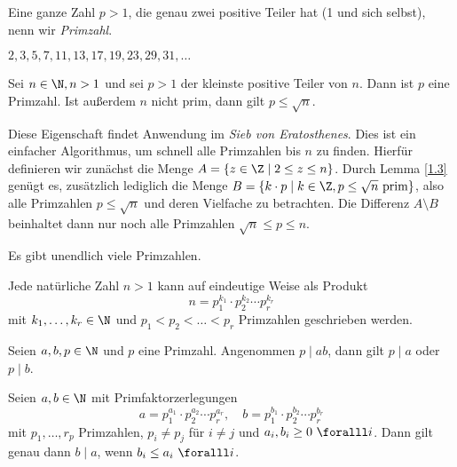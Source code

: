 \begin{defn*}[Primzahl]\video
	Eine ganze Zahl $p > 1$, die genau zwei positive Teiler hat (1 und sich selbst), nenn wir \emph{Primzahl}.
\end{defn*}

\begin{exmp*}
	\( 2,3,5,7,11,13,17,19,23,29,31,\dotsc \)
\end{exmp*}

\begin{lem}\autolabel
	Sei $n \in \N, n > 1$ und sei $p>1$ der kleinste positive Teiler von $n$. Dann ist $p$ eine Primzahl. Ist außerdem $n$ nicht prim, dann gilt $p \leq \sqrt{n}$.
\end{lem}

\begin{rem*}
	Diese Eigenschaft findet Anwendung im \emph{Sieb von Eratosthenes}. Dies ist ein einfacher Algorithmus, um schnell alle Primzahlen bis $n$ zu finden. Hierfür definieren wir zunächst die Menge \( A = \{z \in \Z \mid 2 \leq z \leq n\} \). Durch Lemma \ref{1.3} genügt es, zusätzlich lediglich die Menge $B = \{k \cdot p \mid k \in \Z, p \leq \sqrt{n} \ \text{prim}\}$, also alle Primzahlen $p \leq \sqrt{n}$ und deren Vielfache zu betrachten. Die Differenz $A \setminus B$ beinhaltet dann nur noch alle Primzahlen $\sqrt{n} \leq p \leq n$.
\end{rem*}

\begin{thm}[Euklid]\autolabel
	Es gibt unendlich viele Primzahlen.
\end{thm}

\begin{thm}\autolabel
	Jede natürliche Zahl $n > 1$ kann auf eindeutige Weise als Produkt
	\[ n = p_1^{k_1} \cdot p_2^{k_2} \dotsm p_r^{k_r} \]
	mit $k_1, \dotsc, k_r \in \N$ und $p_1 < p_2 < \dots < p_r$ Primzahlen geschrieben werden.
\end{thm}

\begin{lem}\video\autolabel
	Seien \( a,b, p \in \N \) und $p$ eine Primzahl. Angenommen $p \mid ab$, dann gilt $p \mid a$ oder $p \mid b$.
\end{lem}

\begin{thm}\autolabel
	Seien $a, b \in \N$ mit Primfaktorzerlegungen
	\[ a = p_1^{a_1} \cdot p_2^{a_2} \dotsm p_r^{a_r},\quad b = p_1^{b_1} \cdot p_2^{b_2} \dotsm p_r^{b_r} \]
	mit $p_1, \dotsc,r_p$ Primzahlen, $p_i \neq p_j$ für $i \neq j$ und $a_i,b_i \geq 0\ \foralll i$. Dann gilt genau dann \( b \mid a \), wenn \( b_i \leq a_i \ \foralll i \).
\end{thm}


